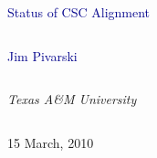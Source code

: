 \documentclass[compress]{beamer}
\begin{document}
\begin{frame}
\vfill
\begin{center}
\textcolor{darkblue}{\Large Status of CSC Alignment}

\vfill
\begin{columns}
\begin{center}
\large
\textcolor{darkblue}{Jim Pivarski}
\end{center}
\end{columns}

\begin{columns}
\begin{center}
\scriptsize
{\it Texas A\&M University}
\end{center}
\end{columns}

\vfill
15 March, 2010

\end{center}
\end{frame}


\small
\end{document}
